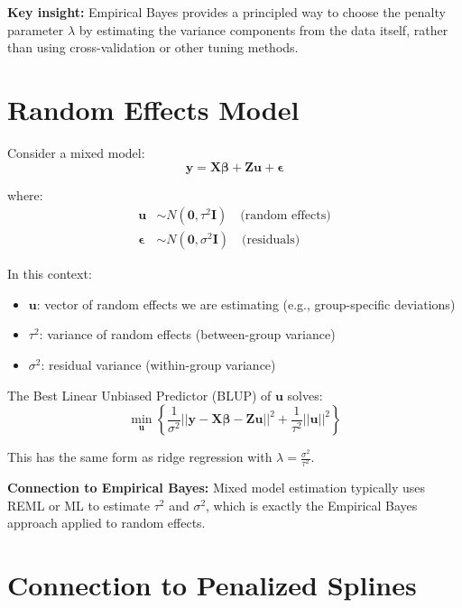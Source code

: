 \documentclass[11pt]{article}
\begin{document}
\textbf{Key insight:} Empirical Bayes provides a principled way to choose the penalty parameter $\lambda$ by estimating the variance components from the data itself, rather than using cross-validation or other tuning methods.

\section{Random Effects Model}

Consider a mixed model:
\begin{equation}
\mathbf{y} = \mathbf{X}\boldsymbol{\beta} + \mathbf{Z}\mathbf{u} + \boldsymbol{\epsilon}
\end{equation}

where:
\begin{align}
\mathbf{u} &\sim N(\mathbf{0}, \tau^2\mathbf{I}) \quad \text{(random effects)} \\
\boldsymbol{\epsilon} &\sim N(\mathbf{0}, \sigma^2\mathbf{I}) \quad \text{(residuals)}
\end{align}

In this context:
\begin{itemize}
    \item $\mathbf{u}$: vector of random effects we are estimating (e.g., group-specific deviations)
    \item $\tau^2$: variance of random effects (between-group variance)
    \item $\sigma^2$: residual variance (within-group variance)
\end{itemize}

The Best Linear Unbiased Predictor (BLUP) of $\mathbf{u}$ solves:
\begin{equation}
\min_{\mathbf{u}} \left\{\frac{1}{\sigma^2}||\mathbf{y} - \mathbf{X}\boldsymbol{\beta} - \mathbf{Z}\mathbf{u}||^2 + \frac{1}{\tau^2}||\mathbf{u}||^2\right\}
\end{equation}

This has the same form as ridge regression with $\lambda = \frac{\sigma^2}{\tau^2}$.

\textbf{Connection to Empirical Bayes:} Mixed model estimation typically uses REML or ML to estimate $\tau^2$ and $\sigma^2$, which is exactly the Empirical Bayes approach applied to random effects.

\section{Connection to Penalized Splines}
\end{document}

